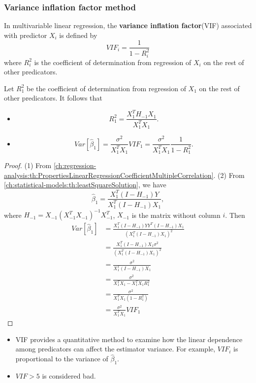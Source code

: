 \begin{refsection}
\subsubsection{Variance inflation factor method}

\begin{definition}\cite[335]{montgomery2012introduction}
	In multivariable linear regression, the \textbf{variance inflation factor}(VIF) associated with predictor $X_i$ is defined by
	$$VIF_i = \frac{1}{1-R_{i}^2}$$
	where $R^2_{i}$ is the coefficient of determination from regression of $X_i$ on the rest of other predicators.
\end{definition}


\begin{lemma}
Let $R^2_1$ be the coefficient of determination from regression of $X_1$ on the rest of other predicators.	
It follows that
\begin{itemize}
	\item $$R_1^2 = \frac{X_1^TH_{-1}X_1}{X_1^TX_1}.$$
	\item $$Var[\hat{\beta}_1] = \frac{\sigma^2}{X_1^TX_1}VIF_1 = \frac{\sigma^2}{X_1^TX_1}\frac{1}{1-R_1^2}.$$
\end{itemize}
\end{lemma}
\begin{proof}
(1) From \autoref{ch:regression-analysis:th:PropertiesLinearRegressionCoefficientMultipleCorrelation}.
(2) From \autoref{ch:statistical-models:th:leastSquareSolution}, we have $$\hat{\beta}_1 = \frac{X_1^T(I - H_{-1})Y}{X_1^T(I-H_{-1})X_1},$$
where $H_{-1} = X_{-1}(X_{-1}^TX_{-1})^{-1} X_{-1}^T$, $X_{-1}$ is the matrix without column $i$.
Then
\begin{align*}
Var[\hat{\beta}_1] &= \frac{X_1^T(I - H_{-1})YY^T(I - H_{-1})X_1}{(X_1^T(I-H_{-1})X_1)^2} \\
&= \frac{X_1^T(I - H_{-1})X_1 \sigma^2}{(X_1^T(I-H_{-1})X_1)^2} \\
&=\frac{\sigma^2}{X_1^T(I-H_{-1})X_1} \\
&=\frac{\sigma^2}{X_1^TX_1 - X_1^TX_1R_1^2} \\
&=\frac{\sigma^2}{X_1^TX_1(1 - R_1^2)} \\
&=\frac{\sigma^2}{X_1^TX_1}VIF_1
\end{align*}
\end{proof}


\begin{remark}[interpretation]\hfill
	\begin{itemize}
		\item VIF provides a quantitative method to examine how the linear dependence among predicators can affect the estimator variance.  For example, $VIF_i$ is proportional to the variance of $\hat{\beta}_1$.
		\item $VIF > 5 $ is considered bad.
	\end{itemize}
	

\end{remark}
\end{refsection}
